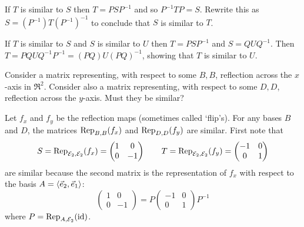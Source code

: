 \begin{exercises}
\begin{answer}
       If \( T \) is similar to \( S \) then \( T=PSP^{-1} \)
       and so \( P^{-1}TP=S \).
       Rewrite this as \( S=(P^{-1})T(P^{-1})^{-1} \) to conclude that
       $S$ is similar to \( T \).

       If \( T \) is similar to \( S \) and \( S \) is similar to \( U \)
       then \( T=PSP^{-1} \) and \( S=QUQ^{-1} \).
       Then \( T=PQUQ^{-1}P^{-1}=(PQ)U(PQ)^{-1} \), showing that \( T \)
       is similar to \( U \).  
     \end{answer}
  \item 
     Consider a 
     matrix representing, with respect to some $B,B$, 
     reflection across the \( x \)-axis in \( \Re^2 \).
     Consider also  
     a matrix representing, with respect to some $D,D$,
     reflection across the \( y \)-axis.
     Must they be similar?
     \begin{answer}
        Let $f_x$ and $f_y$ be the reflection maps (sometimes called `flip's).
        For any bases
        \( B \) and \( D \), the matrices \( \rep{f_x}{B,B}  \) and
        \( \rep{f_y}{D,D} \) are similar.
        First note that
        \begin{equation*}
           S=\rep{f_x}{\stdbasis_2,\stdbasis_2}=
           \begin{pmatrix}
              1  &0  \\
              0  &-1
           \end{pmatrix}
           \qquad
           T=\rep{f_y}{\stdbasis_2,\stdbasis_2}=
           \begin{pmatrix}
             -1  &0  \\
              0  &1
           \end{pmatrix}
        \end{equation*}
        are similar because the second matrix is the representation of $f_x$
        with respect to the basis \( A=\sequence{\vec{e}_2,\vec{e}_1} \):
        \begin{equation*}
           \begin{pmatrix}
              1  &0  \\
              0  &-1
           \end{pmatrix}
           =    
           P
           \begin{pmatrix}
             -1  &0  \\
              0  &1
           \end{pmatrix}
           P^{-1}
        \end{equation*}
        where $P=\rep{\identity}{A,\stdbasis_2}$.

\end{answer}
\end{exercises}
